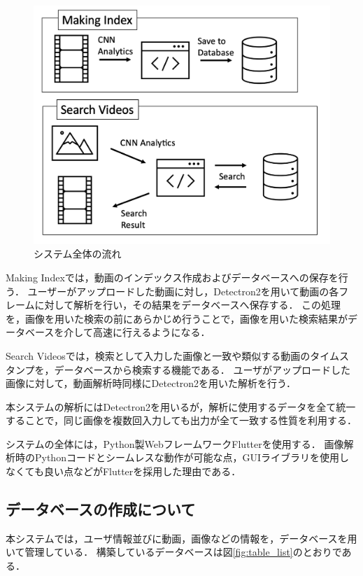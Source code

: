\documentclass[a4j,12pt,dvipdfmx]{jreport}
\begin{document}
\begin{figure}[t]
  \centering
  \includegraphics[width=13cm]{image/flow.png}
  \caption{システム全体の流れ}
  \label{fig:flow}
\end{figure}

Making Indexでは，動画のインデックス作成およびデータベースへの保存を行う．
ユーザーがアップロードした動画に対し，Detectron2を用いて動画の各フレームに対して解析を行い，その結果をデータベースへ保存する．
この処理を，画像を用いた検索の前にあらかじめ行うことで，画像を用いた検索結果がデータベースを介して高速に行えるようになる．

Search Videosでは，検索として入力した画像と一致や類似する動画のタイムスタンプを，データベースから検索する機能である．
ユーザがアップロードした画像に対して，動画解析時同様にDetectron2を用いた解析を行う．

本システムの解析にはDetectron2を用いるが，解析に使用するデータを全て統一することで，同じ画像を複数回入力しても出力が全て一致する性質を利用する．

システムの全体には，Python製WebフレームワークFlutterを使用する．
画像解析時のPythonコードとシームレスな動作が可能な点，GUIライブラリを使用しなくても良い点などがFlutterを採用した理由である．

\subsection{データベースの作成について}\label{chap3-3-1}
本システムでは，ユーザ情報並びに動画，画像などの情報を，データベースを用いて管理している．
構築しているデータベースは図\ref{fig:table_list}のとおりである．
\end{document}
